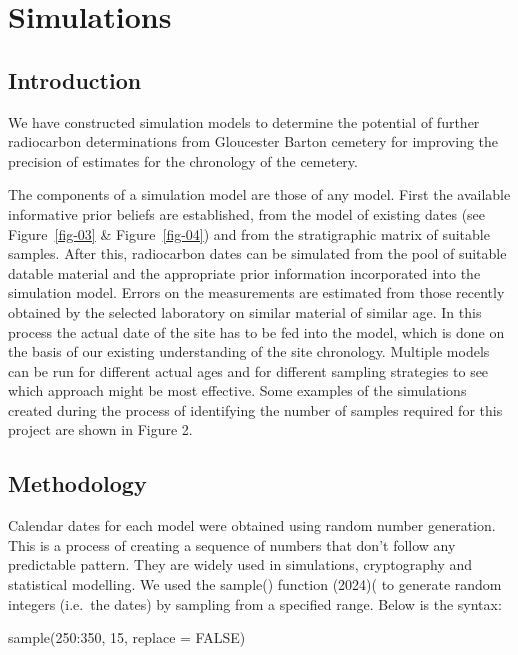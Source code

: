 \documentclass[
]{agujournal2019}
\newenvironment{Shaded}{\begin{snugshade}}{\end{snugshade}}
\newcommand{\AttributeTok}[1]{\textcolor[rgb]{0.40,0.45,0.13}{#1}}
\newcommand{\ConstantTok}[1]{\textcolor[rgb]{0.56,0.35,0.01}{#1}}
\newcommand{\DecValTok}[1]{\textcolor[rgb]{0.68,0.00,0.00}{#1}}
\newcommand{\FunctionTok}[1]{\textcolor[rgb]{0.28,0.35,0.67}{#1}}
\newcommand{\NormalTok}[1]{\textcolor[rgb]{0.00,0.23,0.31}{#1}}
\newcommand{\SpecialCharTok}[1]{\textcolor[rgb]{0.37,0.37,0.37}{#1}}
\begin{document}
\section{Simulations}\label{simulations}

\subsection{Introduction}\label{introduction-1}

We have constructed simulation models to determine the potential of
further radiocarbon determinations from Gloucester Barton cemetery for
improving the precision of estimates for the chronology of the cemetery.

The components of a simulation model are those of any model. First the
available informative prior beliefs are established, from the model of
existing dates (see Figure~\ref{fig-03} \& Figure~\ref{fig-04}) and from
the stratigraphic matrix of suitable samples. After this, radiocarbon
dates can be simulated from the pool of suitable datable material and
the appropriate prior information incorporated into the simulation
model. Errors on the measurements are estimated from those recently
obtained by the selected laboratory on similar material of similar age.
In this process the actual date of the site has to be fed into the
model, which is done on the basis of our existing understanding of the
site chronology. Multiple models can be run for different actual ages
and for different sampling strategies to see which approach might be
most effective. Some examples of the simulations created during the
process of identifying the number of samples required for this project
are shown in Figure 2.

\subsection{Methodology}\label{methodology}

Calendar dates for each model were obtained using random number
generation. This is a process of creating a sequence of numbers that
don't follow any predictable pattern. They are widely used in
simulations, cryptography and statistical modelling. We used the
sample() function (2024)( to generate random integers (i.e.~the dates)
by sampling from a specified range. Below is the syntax:

\begin{Shaded}
\begin{Highlighting}[]
\FunctionTok{sample}\NormalTok{(}\DecValTok{250}\SpecialCharTok{:}\DecValTok{350}\NormalTok{, }\DecValTok{15}\NormalTok{, }\AttributeTok{replace =} \ConstantTok{FALSE}\NormalTok{)}
\end{Highlighting}
\end{Shaded}
\end{document}
